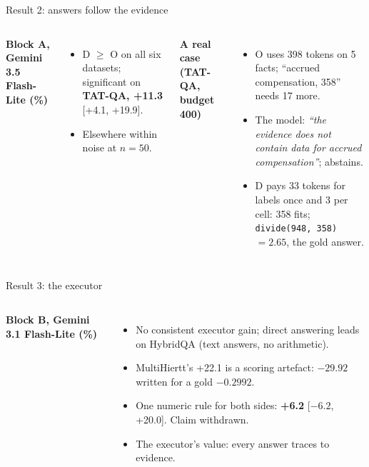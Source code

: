 \documentclass[aspectratio=169,11pt]{beamer}
\newcommand{\pos}[1]{\textcolor{deporange}{\textbf{#1}}}
\begin{document}
\begin{frame}{Result 2: answers follow the evidence}
\begin{columns}[T]
\textbf{\small Block A, Gemini 3.5 Flash-Lite (\%)}\par\vspace{.3em}
\scriptsize\setlength{\tabcolsep}{2.5pt}
\resizebox{\linewidth}{!}{}
\vspace{.3em}
\footnotesize
\begin{itemize}\itemsep2pt
\item D $\geq$ O on all six datasets; significant on \pos{TAT-QA, +11.3} [+4.1, +19.9].
\item Elsewhere within noise at $n = 50$.
\end{itemize}
\footnotesize
\textbf{A real case (TAT-QA, budget 400)}
\begin{itemize}\itemsep3pt
\item O uses 398 tokens on 5 facts; ``accrued compensation, 358'' needs 17 more.
\item The model: \emph{``the evidence does not contain data for accrued compensation''}; abstains.
\item D pays 33 tokens for labels once and 3 per cell: 358 fits; \texttt{divide(948, 358)} $= 2.65$, the gold answer.
\end{itemize}
\end{columns}
\end{frame}

\begin{frame}{Result 3: the executor}
\begin{columns}[T]
\textbf{\small Block B, Gemini 3.1 Flash-Lite (\%)}\par\vspace{.3em}
\scriptsize\setlength{\tabcolsep}{2.5pt}
\resizebox{\linewidth}{!}{}
\footnotesize
\begin{itemize}\itemsep4pt
\item No consistent executor gain; direct answering leads on HybridQA (text answers, no arithmetic).
\item MultiHiertt's +22.1 is a scoring artefact: $-29.92$ written for a gold $-0.2992$.
\item One numeric rule for both sides: \pos{+6.2} [$-6.2$, +20.0]. Claim withdrawn.
\item The executor's value: every answer traces to evidence.
\end{itemize}
\end{columns}
\end{frame}
\end{document}
